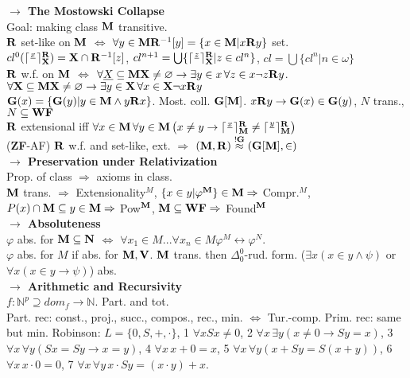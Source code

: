 \documentclass[9pt]{article}
\newcommand{\class}[1]{{\bf #1}}
\newcommand{\N}{\mathbb{N}}
\newcommand{\mytitle}[1]{ {\bf $\rightarrow$ #1}\\}
\newcommand{\V}{\class{V}}
\newcommand{\M}{\class{M}}
\newcommand{\Rr}{\class{R}}
\newcommand{\WF}{\class{WF}}
\newcommand{\X}{\class{X}}
\begin{document}
\begin{multicols*}{2}
\mytitle{The Mostowski Collapse}
Goal: making class $\class{M}$ transitive.\\
$\class{R}$ set-like on $\class{M}$ $\Leftrightarrow$ $\forall y\in \class{M} \class{R}^{-1}[y]=\{x\in \class{M}|x\class{R}y\}$ set.\\
$cl^0(\lceil\frac{x}{}\rceil^\Rr_\X)=\X\cap \Rr^{-1}[z]$, $cl^{n+1}=\bigcup\{\lceil\frac{z}{}\rceil^\Rr_\X|z\in cl^n\}$, $cl=\bigcup \{cl^n|n\in\omega\}$\\
$\Rr$ w.f. on $\class{M}$ $\Leftrightarrow$ $\forall \underline{X}\subseteq \M \X\neq\varnothing\to\exists y\in x\,\forall z\in x \neg z\Rr y$.
$\forall\class{X}\subseteq\class{M} \class{X}\neq\varnothing\to\exists y\in\class{X}\,\forall x\in\class{X}\neg x\Rr y$\\
$\class{G}(x)=\{\class{G}(y)|y\in\class{M}\wedge y\class{R}x\}$. Most. coll. $\class{G}[\class{M}]$. $x\class{R}y\to \class{G}(x)\in\class{G}(y)$, $N$ trans., $N\subseteq \WF$\\
$\Rr$ extensional iff $\forall x\in\M\,\forall y\in\M\left(x\neq y\to \lceil\frac{x}{}\rceil^\Rr_\M \neq\lceil\frac{y}{}\rceil_\M^\Rr\right)$\\
(\class{ZF}-AF) $\Rr$ w.f. and set-like, ext. $\Rightarrow$ $(\M,\Rr)\overset{!\class{G}}{\approx}(\class{G}[\M],\in)$\\
\mytitle{Preservation under Relativization}
Prop. of class $\Rightarrow$ axioms in class.\\
$\class{M}$ trans. $\Rightarrow$ Extensionality$^M$, $\{x\in y|\varphi^\M\}\in\M\Rightarrow$ Compr.$^M$, $P(x)\cap\M\subseteq y\in \M\Rightarrow$ Pow$^\M$, $\M\subseteq \WF\Rightarrow$ Found$^\M$\\
\mytitle{Absoluteness}
$\varphi$ abs. for $\class{M}\subseteq\class{N}$ $\Leftrightarrow$ $\forall x_1\in M...\forall x_n\in M \varphi^M\leftrightarrow\varphi^N$.\\
$\varphi$ abs. for $M$ if abs. for $\class{M}, \V$.
$\class{M}$ trans. then $\Delta_0^0$-rud. form. ($\exists x(x\in y\wedge\psi)$ or $\forall x(x\in y\to\psi)$) abs.\\
\mytitle{Arithmetic and Recursivity}
$f\colon \N^p\supseteq dom_f\to \N$. Part. and tot.\\
Part. rec: const., proj., succ., compos., rec., min. $\Leftrightarrow$ Tur.-comp. Prim. rec: same but min.
Robinson: $L=\{0,S,+,\cdot\}$, 1 $\forall x Sx\neq 0$, 2 $\forall x\,\exists y (x\neq 0\to Sy=x)$, 3 $\forall x \,\forall y (Sx=Sy\to x=y)$, 4 $\forall x\,x+0=x$, 5 $\forall x\,\forall y (x+Sy=S(x+y))$, 6 $\forall x\,x\cdot 0=0$, 7 $\forall x\,\forall y\,x\cdot Sy=(x\cdot y)+x$.

\end{multicols*}
\end{document}
